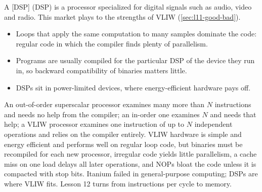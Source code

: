 \documentclass[../main.tex]{subfiles}
\begin{document}
A [DSP]%
 (DSP) is a processor specialized
for digital signals such as audio, video and radio.  This market plays to the
strengths of VLIW (\cref{sec:l11-good-bad}).
\begin{itemize}
  \item Loops that apply the same computation to many samples dominate the
    code: regular code in which the compiler finds plenty of parallelism.
  \item Programs are usually compiled for the particular DSP of the device
    they run in, so backward compatibility of binaries matters little.
  \item DSPs sit in power-limited devices, where energy-efficient hardware
    pays off.
\end{itemize}

\begin{keypoint}
  An out-of-order superscalar processor examines many more than $N$
  instructions and needs no help from the compiler; an in-order one examines
  $N$ and needs that help; a VLIW processor examines one
  instruction of up to $N$ independent operations and relies on the compiler
  entirely.  VLIW hardware is simple and energy efficient and performs well on
  regular loop code, but binaries must be recompiled for each new processor,
  irregular code yields little parallelism, a cache miss on one load delays
  all later operations, and NOPs bloat the code unless it is compacted with
  stop bits.  Itanium failed in general-purpose computing; DSPs are where
  VLIW fits.  Lesson 12 turns from instructions per cycle to memory.
\end{keypoint}
\end{document}
